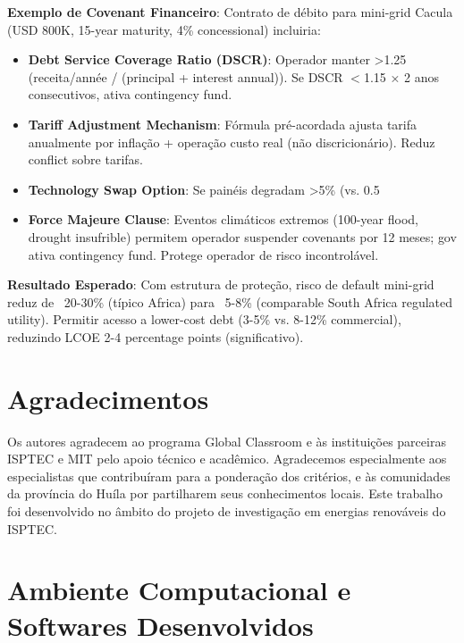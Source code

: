 \documentclass[12pt, a4paper]{article}
\begin{document}
{{{{{{{{{{{{\textbf{Exemplo de Covenant Financeiro}: Contrato de débito para mini-grid Cacula (USD 800K, 15-year maturity, 4\% concessional) incluiria:
\begin{itemize}
\item \textbf{Debt Service Coverage Ratio (DSCR)}: Operador manter >1.25 (receita/année / (principal + interest annual)). Se DSCR $<$1.15 × 2 anos consecutivos, ativa contingency fund.
\item \textbf{Tariff Adjustment Mechanism}: Fórmula pré-acordada ajusta tarifa anualmente por inflação + operação custo real (não discricionário). Reduz conflict sobre tarifas.
\item \textbf{Technology Swap Option}: Se painéis degradam >5\% (vs. 0.5%
\item \textbf{Force Majeure Clause}: Eventos climáticos extremos (100-year flood, drought insufrible) permitem operador suspender covenants por 12 meses; gov ativa contingency fund. Protege operador de risco incontrolável.
\end{itemize}

\textbf{Resultado Esperado}: Com estrutura de proteção, risco de default mini-grid reduz de ~20-30\% (típico Africa) para ~5-8\% (comparable South Africa regulated utility). Permitir acesso a lower-cost debt (3-5\% vs. 8-12\% commercial), reduzindo LCOE 2-4 percentage points (significativo).

\section*{Agradecimentos}

Os autores agradecem ao programa Global Classroom e às instituições parceiras ISPTEC e MIT pelo apoio técnico e acadêmico. Agradecemos especialmente aos especialistas que contribuíram para a ponderação dos critérios, e às comunidades da província do Huíla por partilharem seus conhecimentos locais. Este trabalho foi desenvolvido no âmbito do projeto de investigação em energias renováveis do ISPTEC.




\appendix

\section{Ambiente Computacional e Softwares Desenvolvidos}

}}}}}}}}}}}}
\end{document}
